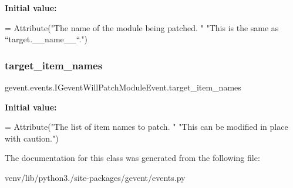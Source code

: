 {\bfseries Initial value\+:}
\begin{DoxyCode}
=  Attribute(\textcolor{stringliteral}{"The name of the module being patched. "}
                            \textcolor{stringliteral}{"This is the same as ``target.\_\_name\_\_``."})
\end{DoxyCode}
\mbox{\label{classgevent_1_1events_1_1_i_gevent_will_patch_module_event_ab56fc979b9c9807235b52575e1ad950b}} 
\subsubsection{\texorpdfstring{target\+\_\+item\+\_\+names}{target\_item\_names}}
{\footnotesize\ttfamily gevent.\+events.\+I\+Gevent\+Will\+Patch\+Module\+Event.\+target\+\_\+item\+\_\+names\hspace{0.3cm}{\ttfamily [static]}}

{\bfseries Initial value\+:}
\begin{DoxyCode}
=  Attribute(\textcolor{stringliteral}{"The list of item names to patch. "}
                                  \textcolor{stringliteral}{"This can be modified in place with caution."})
\end{DoxyCode}


The documentation for this class was generated from the following file\+:\begin{DoxyCompactItemize}
\item 
venv/lib/python3./site-\/packages/gevent/events.\+py\end{DoxyCompactItemize}
